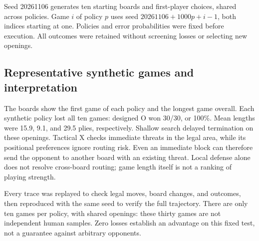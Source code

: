 \documentclass[UTF8,fontset=fandol,11pt,a4paper]{ctexart}
\begin{document}
Seed 20261106 generates ten starting boards and first-player choices,
shared across policies. Game $i$ of policy $p$ uses seed
$20261106+1000p+i-1$, both indices starting at one. Policies and error
probabilities were fixed before execution. All outcomes were retained
without screening losses or selecting new openings.

\begin{table}[htbp]
  \centering\small
  \caption{Synthetic opponents versus designed O; not human statistics.}
  
\end{table}

\begin{table}[htbp]
  \centering\small
  \caption{All thirty synthetic games. Starting boards are numbered 0--8.}
  \begin{minipage}[t]{.48\linewidth}\centering
    
  \end{minipage}\hfill
  \begin{minipage}[t]{.48\linewidth}\centering
    
  \end{minipage}
\end{table}

\clearpage
\subsection{Representative synthetic games and interpretation}


The boards show the first game of each policy and the longest game overall.
Each synthetic policy lost all ten games: designed O won 30/30, or 100\%.
Mean lengths were 15.9, 9.1, and 29.5 plies, respectively. Shallow search
delayed termination on these openings. Tactical X checks immediate threats
in the legal area, while its positional preferences ignore routing risk.
Even an immediate block can therefore send the opponent to another board
with an existing threat. Local defense alone does not resolve cross-board
routing; game length itself is not a ranking of playing strength.

Every trace was replayed to check legal moves, board changes, and outcomes,
then reproduced with the same seed to verify the full trajectory.
There are only ten games per policy, with shared openings: these thirty
games are not independent human samples. Zero losses establish an advantage
on this fixed test, not a guarantee against arbitrary opponents.
\end{document}
